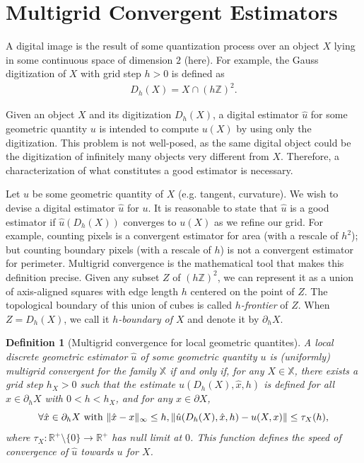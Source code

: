\documentclass[runningheads]{llncs}
\newtheorem{ddef}{Definition}
\DeclarePairedDelimiter\norm{\lVert}{\rVert}%
\begin{document}
\section{Multigrid Convergent Estimators}



A digital image is the result of some quantization process over an object $X$ lying in some continuous space of
dimension $2$ (here).  For example, the Gauss digitization of $X$ with grid step $h>0$ is defined as
\begin{align*}
	D_h(X) = X \cap (h\mathbb{Z})^2.
\end{align*} 

Given an object $X$ and its digitization $D_h(X)$, a digital estimator $\hat{u}$ for some geometric quantity $u$ is
intended to compute $u(X)$ by using only the digitization. This problem is not well-posed, as the same digital object
could be the digitization of infinitely many objects very different from $X$. Therefore, a characterization of what constitutes
a good estimator is necessary.

Let $u$ be some geometric quantity of $X$ (e.g. tangent, curvature). We wish to devise a digital estimator $\hat{u}$ for
$u$. It is reasonable to state that $\hat{u}$ is a good estimator if $\hat{u}(D_h(X))$ converges to $u(X)$ as we refine
our grid. For example, counting pixels is a convergent estimator for area (with a rescale of $h^2$); but counting
boundary pixels (with a rescale of $h$) is not a convergent estimator for perimeter. Multigrid convergence is the
mathematical tool that makes this definition precise. Given any subset $Z$ of $(h\mathbb{Z})^2$, we can represent it as a
union of axis-aligned squares with edge length $h$ centered on the point of $Z$. The topological boundary of this union
of cubes is called {\em $h$-frontier} of $Z$. When $Z=D_h(X)$, we call it {\em $h$-boundary of $X$} and denote it by
$\partial_h X$.

\begin{ddef}[Multigrid convergence for local geometric quantites]
  A local discrete geometric estimator $\hat{u}$ of some geometric
  quantity $u$ is (uniformly) multigrid convergent for the family $\mathbb{X}$ if
  and only if, for any $X \in \mathbb{X}$, there exists a grid step
  $h_X>0$ such that the estimate $\hat{u}(D_h(X),\hat{x},h)$ is
  defined for all $\hat{x} \in \partial_hX$ with $ 0 < h < h_X$, and
  for any $x \in \partial X$,
  \begin{equation*}
    \forall \hat{x} \in  \partial_hX \text{ with } \norm{ \hat{x} - x }_{\infty} \leq h, \norm{ \hat{u}(D_h(X),\hat{x},h) - u(X,x)} \leq \tau_{X}(h),			
  \end{equation*}
  where $\tau_{X}:\mathbb{R}^{+}\setminus\{0\} \rightarrow
  \mathbb{R}^{+}$ has null limit at $0$. This function defines the
  speed of convergence of $\hat{u}$ towards $u$ for $X$.
\end{ddef}
	
\end{document}
